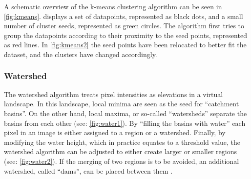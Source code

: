 \noindent
A schematic overview of the k-means clustering algorithm can be seen in \cref{fig:kmeans}.
 displays a set of datapoints, represented as black dots, and a small number of
cluster seeds, represented as green circles.
The algorithm first tries to group the datapoints according to their proximity to the seed points, represented as red lines.
In \cref{fig:kmeans2} the seed points have been relocated to better fit the dataset, and the clusters have changed accordingly.


\subsubsection{Watershed}
The watershed algorithm treats pixel intensities as elevations in a virtual landscape.
In this landscape, local minima are seen as the seed for ``catchment basins''.
On the other hand, local maxima, or so-called ``watersheds'' separate the basins from each other (see: \cref{fig:water1}).
By ``filling the basins with water'' each pixel in an image is either assigned to a region or a watershed.
Finally, by modifying the water height, which in practice equates to a threshold value,
the watershed algorithm can be adjusted to either create larger or smaller regions (see: \cref{fig:water2}).
If the merging of two regions is to be avoided, an additional watershed, called ``dams'',
can be placed between them \cite{preimImageAnalysisMedical2014,hahnIWTinteractiveWatershedTransform2003}.
